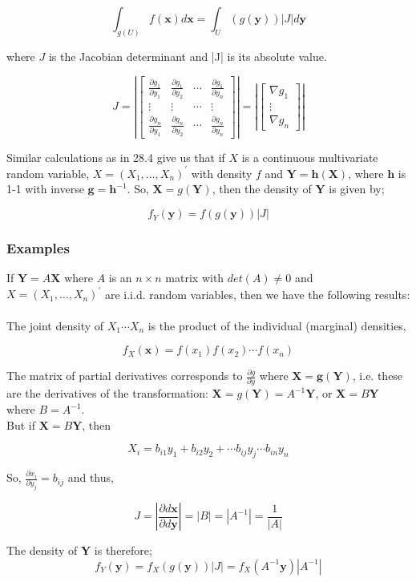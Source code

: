 \documentclass[12pt,a4paper]{article}
\theoremstyle{regla}
\theoremstyle{remark}
\theoremstyle{definition}
\theoremstyle{nonumberbreak}
\begin{document}
$$\int_{g(U)} f(\mathbf {x})d\mathbf {x}  = \int_{U}({g}(\mathbf {y}))|J|d\mathbf {y}$$

where $J$ is the Jacobian determinant and |J| is its absolute value.


$$J= 
\left|\begin{bmatrix}
\frac{\partial g_1}{\partial y_1} & \frac{\partial g_1}{\partial y_2} & \cdots &\frac{\partial g_1}{\partial y_n} \\
\vdots & \vdots & \cdots & \vdots \\
\frac{\partial g_n}{\partial y_1} & \frac{\partial g_n}{\partial y_2} & \cdots & \frac{\partial g_n}{\partial y_n} 
\end{bmatrix}\right| = 
\left|\begin{bmatrix}
\nabla g_1 \\
 \vdots \\
\nabla g_n 
\end{bmatrix}\right|$$

Similar calculations as in 28.4 give us that if $X$ is a continuous multivariate random variable, $X = (X_1, \ldots, X_n)^\prime$ with density $f$ and $\mathbf{Y}  = \mathbf{h} (\mathbf{X})$, where $\mathbf{h}$ is 1-1 with inverse $ \mathbf g= \mathbf{h}^{-1}$. So, $\mathbf{X} = g(\mathbf{Y})$, then the density of $\mathbf{Y}$ is given by;

$$f_Y(\mathbf y)   = f (g(\mathbf y)) |J|$$


\subsubsection{Examples}
\begin{xmpl}

If $\mathbf{Y} = A \mathbf X$ where $A$ is an $n \times n$ matrix with $det(A)\neq0$ and $X = (X_1, \ldots, X_n)^\prime $ are i.i.d. random variables, then we have the following results:\\\\

The joint density of $ X_1 \cdots X_n$ is the product of the individual (marginal) densities,

$$f_X(\mathbf x)= f(x_1) f(x_2) \cdots f(x_n)$$

The matrix of partial derivatives corresponds to  $\frac{\partial g}{\partial y}$ where $\mathbf X = \mathbf g(\mathbf{Y})$, i.e. these are the derivatives of the transformation: $\mathbf X = g (\mathbf{Y}) = A^{-1}\mathbf{Y}$, or $\mathbf X = B \mathbf{Y}$ where $B = A^{-1}$.\\
 
But if $\mathbf X = B \mathbf{Y}$, then
 
$$X_i = b_{i1}y_1 + b_{i2}y_2 + \cdots b_{ij}y_j\cdots b_{in}y_n$$

So, $ \frac{\partial x_i}{\partial y_j} = b_{ij}$ and thus,
 
 $$ J =\left|\frac{\partial d\mathbf x}{\partial d\mathbf y}\right| = |B| = |A^{-1}| = \frac {1}{|A|}$$
 
 The density of $\mathbf{Y}$ is therefore;
 $$f_Y(\mathbf{y})   =  f_X(g(\mathbf{y})) |J| = f_X(A^{-1}\mathbf{y}) |A^{-1}|$$
 
 \end{xmpl}
\end{document}
